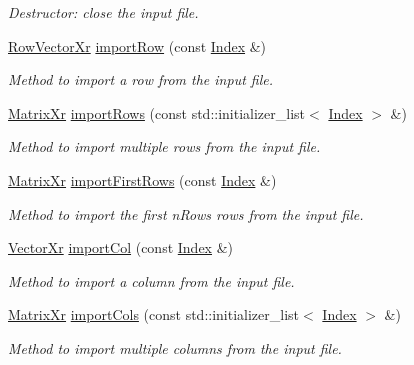 \begin{DoxyCompactItemize}
\begin{DoxyCompactList}\small\item\em Destructor\-: close the input file. \end{DoxyCompactList}\item 
\hyperlink{typedefs_8h_aaf38a491cc6d8aeb1c1f53f380789bad}{Row\-Vector\-Xr} \hyperlink{classCsvParser_a480e8570942d68f55cfae439e210e46e}{import\-Row} (const \hyperlink{typedefs_8h_a2c726f8f32697958e9d6c2afecda531d}{Index} \&)
\begin{DoxyCompactList}\small\item\em Method to import a row from the input file. \end{DoxyCompactList}\item 
\hyperlink{typedefs_8h_a81d507f5d0c665fb16966595c9520a55}{Matrix\-Xr} \hyperlink{classCsvParser_a42817812d475d6a42dee592d5854b297}{import\-Rows} (const std\-::initializer\-\_\-list$<$ \hyperlink{typedefs_8h_a2c726f8f32697958e9d6c2afecda531d}{Index} $>$ \&)
\begin{DoxyCompactList}\small\item\em Method to import multiple rows from the input file. \end{DoxyCompactList}\item 
\hyperlink{typedefs_8h_a81d507f5d0c665fb16966595c9520a55}{Matrix\-Xr} \hyperlink{classCsvParser_ad061e2e592b0f2d1b1f33c12fe0424d6}{import\-First\-Rows} (const \hyperlink{typedefs_8h_a2c726f8f32697958e9d6c2afecda531d}{Index} \&)
\begin{DoxyCompactList}\small\item\em Method to import the first {\itshape n\-Rows} rows from the input file. \end{DoxyCompactList}\item 
\hyperlink{typedefs_8h_aae6cee78ed9cd8f234ed8cb48682548a}{Vector\-Xr} \hyperlink{classCsvParser_ade7034e1a9dba4299e53a96d27aa836e}{import\-Col} (const \hyperlink{typedefs_8h_a2c726f8f32697958e9d6c2afecda531d}{Index} \&)
\begin{DoxyCompactList}\small\item\em Method to import a column from the input file. \end{DoxyCompactList}\item 
\hyperlink{typedefs_8h_a81d507f5d0c665fb16966595c9520a55}{Matrix\-Xr} \hyperlink{classCsvParser_a02ae981df8f4b1e9d5878a7be6a0c867}{import\-Cols} (const std\-::initializer\-\_\-list$<$ \hyperlink{typedefs_8h_a2c726f8f32697958e9d6c2afecda531d}{Index} $>$ \&)
\begin{DoxyCompactList}\small\item\em Method to import multiple columns from the input file. \end{DoxyCompactList}\item 

\end{DoxyCompactItemize}
